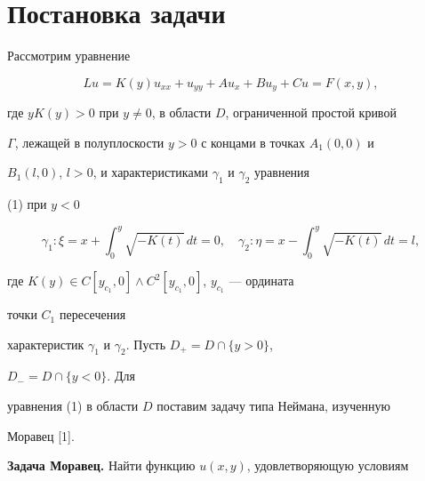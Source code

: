  




\maketitle 


\label{begin} 


 


 


\section{Постановка задачи} 


 


Рассмотрим уравнение 


\begin{equation} 


L u=K(y)u_{xx}+u_{yy}+A u_x+B u_y+C u=F(x,y), 


\end{equation} 


где $y K(y)>0$ при $y\ne0$, в области $D$, ограниченной простой кривой 


$\Gamma$, лежащей в полуплоскости $y>0$ с концами в точках $A_1(0,0)$ и 


$B_1(l,0)$, $l>0$, и характеристиками $\gamma_1$ и $\gamma_2$ уравнения 


(1) при $y<0$ 


$$ 


\gamma_1:\xi=x+\int^y_0 \sqrt{-K(t)}\,dt=0,\quad 


\gamma_2:\eta=x-\int^y_0\sqrt{-K(t)}\,dt=l, 


$$ 


где $K(y)\in C[y_{c_1},0]\wedge C^2[y_{c_1},0]$, $y_{c_1}$ --- ордината 


точки $C_1$ пересечения 


характеристик $\gamma_1$ и $\gamma_2$. Пусть $D_+=D\cap\{y>0\}$, 


$D_-=D\cap\{y<0\}$. Для 


уравнения (1) в области $D$ поставим задачу типа Неймана, изученную 


Моравец [1]. 


\medskip 


 


{\bf Задача Моравец.} Найти функцию $u(x,y)$, удовлетворяющую условиям 


